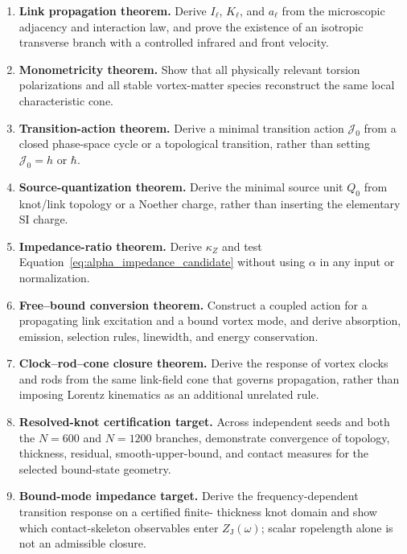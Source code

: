 \documentclass[11pt]{article}
\theoremstyle{definition}
\theoremstyle{plain}
\theoremstyle{remark}
\begin{document}
\begin{enumerate}
    \item \textbf{Link propagation theorem.}
    Derive $I_\ell$, $K_\ell$, and $a_\ell$ from the microscopic adjacency and
    interaction law, and prove the existence of an isotropic transverse branch
    with a controlled infrared and front velocity.

    \item \textbf{Monometricity theorem.}
    Show that all physically relevant torsion polarizations and all stable
    vortex-matter species reconstruct the same local characteristic cone.

    \item \textbf{Transition-action theorem.}
    Derive a minimal transition action $\mathcal J_0$ from a closed phase-space
    cycle or a topological transition, rather than setting
    $\mathcal J_0=h$ or $\hbar$.

    \item \textbf{Source-quantization theorem.}
    Derive the minimal source unit $Q_0$ from knot/link topology or a Noether
    charge, rather than inserting the elementary SI charge.

    \item \textbf{Impedance-ratio theorem.}
    Derive $\kappa_Z$ and test
    Equation~\eqref{eq:alpha_impedance_candidate} without using $\alpha$ in any
    input or normalization.

    \item \textbf{Free--bound conversion theorem.}
    Construct a coupled action for a propagating link excitation and a bound
    vortex mode, and derive absorption, emission, selection rules, linewidth,
    and energy conservation.

    \item \textbf{Clock--rod--cone closure theorem.}
    Derive the response of vortex clocks and rods from the same link-field cone
    that governs propagation, rather than imposing Lorentz kinematics as an
    additional unrelated rule.

    \item \textbf{Resolved-knot certification target.}
    Across independent seeds and both the $N=600$ and $N=1200$ branches,
    demonstrate convergence of topology, thickness, residual,
    smooth-upper-bound, and contact measures for the selected bound-state
    geometry.

    \item \textbf{Bound-mode impedance target.}
    Derive the frequency-dependent transition response on a certified finite-
    thickness knot domain and show which contact-skeleton observables enter
    $Z_{\mathrm J}(\omega)$; scalar ropelength alone is not an admissible closure.
\end{enumerate}
\end{document}
